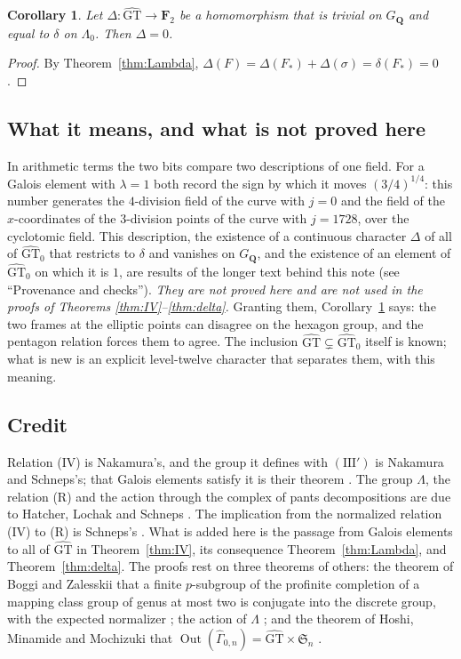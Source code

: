 \documentclass[11pt,a4paper]{article}
\theoremstyle{plain}
\newtheorem{corollary}[theorem]{Corollary}
\theoremstyle{definition}
\theoremstyle{remark}
\newcommand{\GT}{\widehat{\mathrm{GT}}}
\newcommand{\GTz}{\widehat{\mathrm{GT}}_0}
\newcommand{\F}{\mathbf F}
\newcommand{\GQ}{G_{\mathbf Q}}
\newcommand{\Gh}{\widehat\Gamma}
\newcommand{\Out}{\operatorname{Out}}
\begin{document}
\begin{corollary}\label{cor:Delta}
Let $\Delta:\GT\to\F_2$ be a homomorphism that is trivial on $\GQ$ and equal to $\delta$ on $\Lambda_0$. Then
$\Delta=0$.
\end{corollary}

\begin{proof}
By Theorem~\ref{thm:Lambda}, $\Delta(F)=\Delta(F_*)+\Delta(\sigma)=\delta(F_*)=0$.
\end{proof}

\subsection*{What it means, and what is not proved here}
In arithmetic terms the two bits compare two descriptions of one field. For a Galois element with $\lambda=1$ both
record the sign by which it moves $(3/4)^{1/4}$: this number generates the $4$-division field of the curve with
$j=0$ and the field of the $x$-coordinates of the $3$-division points of the curve with $j=1728$, over the
cyclotomic field. This description, the existence of a continuous character $\Delta$ of all of $\GTz$ that
restricts to $\delta$ and vanishes on $\GQ$, and the existence of an element of $\GTz$ on which it is $1$, are
results of the longer text behind this note (see ``Provenance and checks''). \emph{They are not proved here and
are not used in the proofs of Theorems \ref{thm:IV}--\ref{thm:delta}.} Granting them, Corollary~\ref{cor:Delta}
says: the two frames at the elliptic points can disagree on the hexagon group, and the pentagon relation forces
them to agree. The inclusion $\GT\subsetneq\GTz$ itself is known; what is new is an explicit level-twelve character
that separates them, with this meaning.

\subsection*{Credit}
Relation (IV) is Nakamura's, and the group it defines with $(\mathrm{III}')$ is Nakamura and Schneps's; that Galois
elements satisfy it is their theorem \cite[\S1]{NS}. The group $\Lambda$, the relation (R) and the action through
the complex of pants decompositions are due to Hatcher, Lochak and Schneps \cite{HLS}. The implication from the
normalized relation (IV) to (R) is Schneps's \cite[p.~670]{S}. What is added here is the passage from Galois
elements to all of $\GT$ in Theorem~\ref{thm:IV}, its consequence Theorem~\ref{thm:Lambda}, and
Theorem~\ref{thm:delta}. The proofs rest on three theorems of others: the theorem of Boggi and Zalesskii that a
finite $p$-subgroup of the profinite completion of a mapping class group of genus at most two is conjugate into the
discrete group, with the expected normalizer \cite{BZ}; the action of $\Lambda$ \cite{HLS}; and the theorem of
Hoshi, Minamide and Mochizuki that $\Out(\Gh_{0,n})=\GT\times\mathfrak S_n$ \cite{HMM}.
\end{document}
